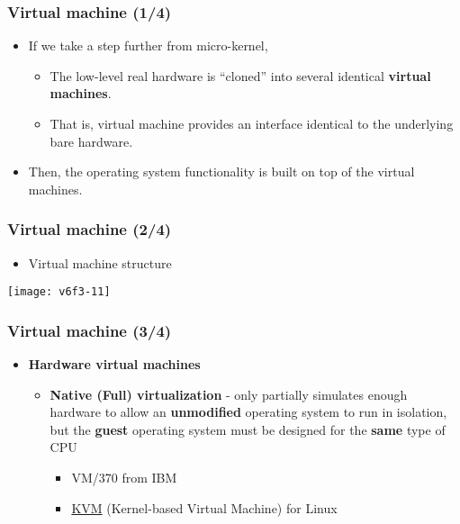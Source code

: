 \documentclass[CJKutf8,dvipsnames,table]{beamer}
\begin{document}
\begin{CJK*}{UTF8}{song}
  \begin{frame}
    \frametitle{Virtual machine (1/4)} \pause
    \begin{itemize}
    \item If we take a step further from micro-kernel,  \pause
      \begin{itemize}
      \item The low-level real hardware is ``cloned'' into several identical \textbf{virtual machines}.  \pause
      \item That is, virtual machine provides an interface identical to the underlying bare hardware.  \pause
      \end{itemize}
    \item Then, the operating system functionality is built on top of the virtual machines. 
    \end{itemize}
  \end{frame}
  
  \begin{frame}
    \frametitle{Virtual machine (2/4)} \pause
    \begin{itemize}
    \item Virtual machine structure  \pause
    \end{itemize}
    \begin{center}
      \texttt{[image: v6f3-11]}
    \end{center}
  \end{frame}

  \begin{frame}
    \frametitle{Virtual machine (3/4)} \pause
    \begin{itemize}
      \item \textbf{Hardware virtual machines}  \pause
        \begin{itemize}
    		\item \textbf{Native (Full) virtualization} \pause - only partially simulates enough hardware to allow an \textbf{unmodified} operating system to run in isolation, but the \textbf{guest} operating system must be designed for the \textbf{same} type of CPU  \pause
    			\begin{itemize}
    			\item VM/370 from IBM  \pause
    			\item \href{http://www.linux-kvm.org/page/Main\_Page}{KVM} (Kernel-based Virtual Machine) for Linux  \pause
    			\end{itemize}
			

\end{itemize}
\end{itemize}
\end{frame}
\end{CJK*}
\end{document}
